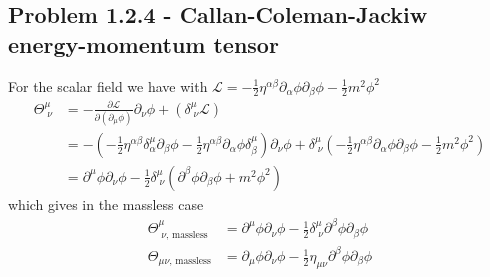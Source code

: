 \documentclass[10pt,a4paper]{book}
\theoremstyle{definition}
\begin{document}
\subsection{Problem 1.2.4 - Callan-Coleman-Jackiw energy-momentum tensor}
For the scalar field we have with $\mathcal{L}=-\frac{1}{2}\eta^{\alpha\beta}\partial_\alpha\phi\partial_\beta\phi-\frac{1}{2}m^2\phi^2$
\begin{align}
    \Theta^\mu_{\;\nu}&=-\frac{\partial\mathcal{L}}{\partial(\partial_\mu\phi)}\partial_\nu\phi+(\delta^\mu_{\;\nu}\mathcal{L})\\
    &=-\left(-\frac{1}{2}\eta^{\alpha\beta}\delta^\mu_{\alpha}\partial_\beta\phi-\frac{1}{2}\eta^{\alpha\beta}\partial_\alpha\phi\delta^\mu_{\beta}\right)\partial_\nu\phi +\delta^\mu_{\;\nu}\left(-\frac{1}{2}\eta^{\alpha\beta}\partial_\alpha\phi\partial_\beta\phi-\frac{1}{2}m^2\phi^2\right)\\
    &=\partial^\mu\phi\partial_\nu\phi -\frac{1}{2}\delta^\mu_{\;\nu}(\partial^\beta\phi\partial_\beta\phi+m^2\phi^2)
\end{align}
which gives in the massless case
\begin{align}
    \Theta^\mu_{\;\nu\text{, massless}}&=\partial^\mu\phi\partial_\nu\phi -\frac{1}{2}\delta^\mu_{\;\nu}\partial^\beta\phi\partial_\beta\phi\\
    \Theta_{\mu\nu\text{, massless}}&=\partial_\mu\phi\partial_\nu\phi -\frac{1}{2}\eta_{\mu\nu}\partial^\beta\phi\partial_\beta\phi
\end{align}
\end{document}
